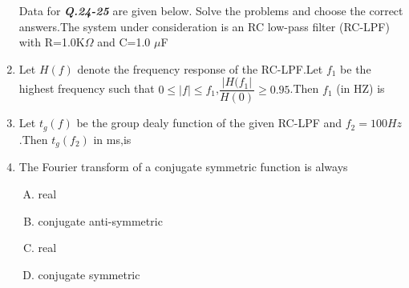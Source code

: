 \documentclass[journal,12pt,twocolumn]{IEEEtran}
\begin{document}
\begin{enumerate}[1.]
\begin{enumerate}[(A)]
\end{enumerate}

Data for \textbf{\textit{Q.24-25}} are given below. Solve the problems and choose the correct answers.\newline The system under consideration is an RC low-pass filter (RC-LPF) with R=1.0K$\Omega$ and C=1.0 $\mu$F

\item Let $H(f)$ denote the frequency response of the RC-LPF.Let $f_1$ be the highest frequency such that $0\leq |f| \leq f_1$,$\dfrac{|H(f_1|}{H(0)}\geq 0.95$.Then $f_1$ (in HZ) is
\begin{enumerate}[(A)]
\end{enumerate}

\item Let $t_g(f)$ be the group dealy function of the given RC-LPF and $f_2=100 Hz$.Then $t_g(f_2)$ in ms,is\\

\begin{enumerate}[(A)]
\end{enumerate}


\item The Fourier transform of a conjugate symmetric function is always
\begin{enumerate}[(A)]

\setlength\itemsep{1em}
\item real
\item conjugate anti-symmetric
\item real
\item conjugate symmetric


\end{enumerate}
\end{enumerate}
\end{document}
